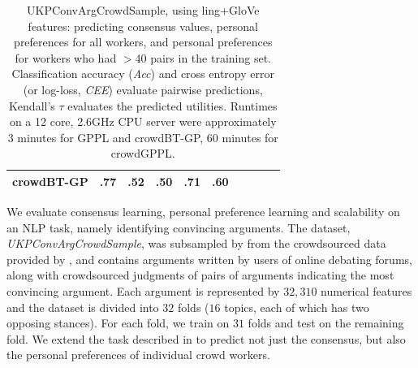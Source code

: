 \begin{table}
{\begin{tabular}{ l l l l@{\hskip 1.0cm} l l l@{\hskip 1.0cm} l l l}
 crowdBT-GP & .77 & .52 & .50 & .71 & .60 & 
 \\\hline
\end{tabular}}
\caption{UKPConvArgCrowdSample,  using ling+GloVe features: predicting consensus values, personal preferences for all workers,
and personal preferences for workers who had $>$40 pairs in the training set.
Classification accuracy (\emph{Acc}) and cross entropy error (or log-loss, \emph{CEE}) evaluate
pairwise predictions, 
Kendall's $\tau$ evaluates the predicted utilities. 
Runtimes on a 12 core, 2.6GHz CPU server were approximately 3 minutes for GPPL and crowdBT-GP, 
 60 minutes for crowdGPPL.
}
\label{tab:convarg}
\end{table}
We evaluate consensus learning, personal preference learning and scalability
on an NLP task, namely identifying convincing arguments. 
The dataset, \emph{UKPConvArgCrowdSample}, was subsampled by \citet{simpson2018finding}
from the crowdsourced data provided by \citet{habernal2016argument}, and
contains arguments written by users
of online debating forums,
along with crowdsourced judgments of pairs of arguments
 indicating the most convincing argument.
Each argument is represented by $32,310$ numerical features and the
dataset is divided into $32$ folds ($16$ topics, each of which has two opposing stances). For each fold, we train on $31$ folds and test on the remaining fold.
We extend
the task described in \citet{simpson2018finding} to predict not just the consensus,
but also the personal preferences of individual crowd workers.
